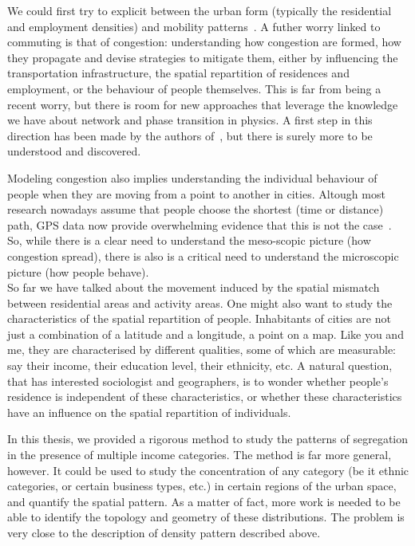 We could first try to explicit between the urban form (typically the residential
and employment densities) and mobility patterns~\cite{Ma:2006,Chowdhury:2013}.
A futher worry linked to commuting is that of congestion: understanding how
congestion are formed, how they propagate and devise strategies to mitigate
them, either by influencing the transportation infrastructure, the spatial
repartition of residences and employment, or the behaviour of people themselves.
This is far from being a recent worry, but there is room for new approaches that
leverage the knowledge we have about network and phase transition in physics. A
first step in this direction has been made by the authors of~\cite{Daqing:2015},
but there is surely more to be understood and discovered.  

Modeling congestion also implies understanding the individual behaviour of
people when they are moving from a point to another in cities. Altough most
research nowadays assume that people choose the shortest (time or distance)
path, GPS data now provide overwhelming evidence that this is not the
case~\cite{Manley:2015}. So, while there is a clear need to understand the meso-scopic
picture (how congestion spread), there is also is a critical need to understand
the microscopic picture (how people behave).\\


So far we have talked about the movement induced by the spatial mismatch between
residential areas and activity areas. One might also want to study the
characteristics of the spatial repartition of people. Inhabitants of cities are
not just a combination of a latitude and a longitude, a point on a map. Like you
and me, they are characterised by different qualities, some of which are
measurable: say their income, their education level, their ethnicity, etc. A
natural question, that has interested sociologist and geographers, is to wonder
whether people's residence is independent of these characteristics, or whether
these characteristics have an influence on the spatial repartition of
individuals.  

In this thesis, we provided a rigorous method to study the patterns of
segregation in the presence of multiple income categories. The method is far
more general, however. It could be used to study the concentration of any
category (be it ethnic categories, or certain business types, etc.)
in certain regions of the urban space, and quantify the spatial pattern. As a
matter of fact, more work is needed to be able to identify the topology and
geometry of these distributions. The problem is very close to the description of
density pattern described above.

